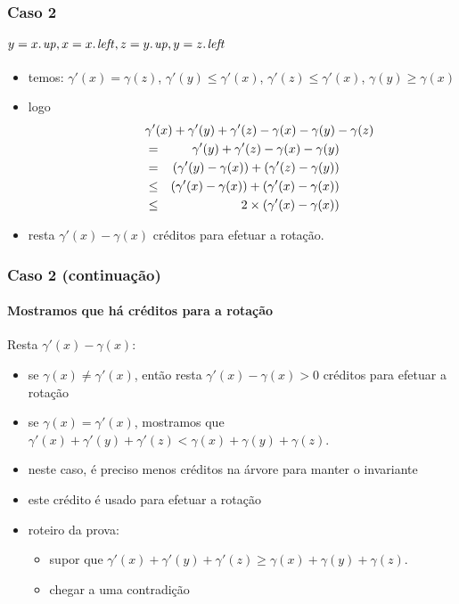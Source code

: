 \documentclass{beamer}
\begin{document}
\begin{frame}
\frametitle{Caso 2}
\framesubtitle{$y = \attrib{x}{up}, x = \attrib{x}{left}, z = \attrib{y}{up}, y = \attrib{z}{left}$}

\begin{itemize}
\item temos: $\gamma'(x) = \gamma(z)$, $\gamma'(y) \le \gamma'(x)$,
$\gamma'(z) \le \gamma'(x)$, $\gamma(y) \ge \gamma(x)$
\item logo 
\begin{eqnarray*}
\lefteqn{\gamma'(x) + \gamma'(y) + \gamma'(z) - \gamma(x) - \gamma(y) - \gamma(z)} \\
 & = & 
\gamma'(y) + \gamma'(z) - \gamma(x) - \gamma(y) \\
& = & (\gamma'(y) - \gamma(x)) + (\gamma'(z) - \gamma(y)) \\
& \le & (\gamma'(x) - \gamma(x)) + (\gamma'(x) - \gamma(x)) \\
& \le & 2 \times(\gamma'(x) - \gamma(x))
\end{eqnarray*}
\item resta $\gamma'(x) - \gamma(x)$ créditos para efetuar a rotação.
\end{itemize}
\end{frame}

\begin{frame}
\frametitle{Caso 2 (continuação)}
\framesubtitle{Mostramos que há créditos para a rotação}

Resta $\gamma'(x) - \gamma(x)$:
\begin{itemize}
\item se $\gamma(x) \neq \gamma'(x)$, então resta $\gamma'(x) - \gamma(x) > 0$ créditos para efetuar a rotação
\pause
\item se $\gamma(x) = \gamma'(x)$, mostramos que
$\gamma'(x) + \gamma'(y) + \gamma'(z) < \gamma(x) + \gamma(y) + \gamma(z)$.
\item neste caso, é preciso menos créditos na árvore para manter o invariante
\item este crédito é usado para efetuar a rotação
\item roteiro da prova:
\begin{itemize}
\item supor que 
$\gamma'(x) + \gamma'(y) + \gamma'(z) \ge \gamma(x) + \gamma(y) + \gamma(z)$.
\item chegar a uma contradição
\end{itemize}
\end{itemize}
\end{frame}
\end{document}
